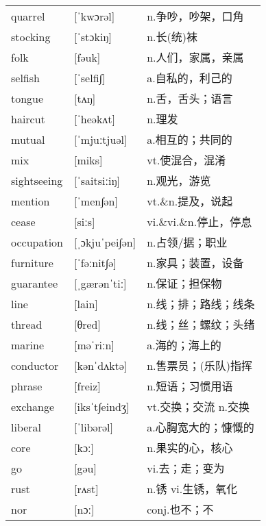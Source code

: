 \documentclass[a4paper]{article}
\begin{document}
\section{}
\begin{tabular}{l l l}

quarrel & [ˈkwɔrəl] & n.争吵，吵架，口角 \\
stocking & [ˈstɔkiŋ] & n.长(统)袜 \\
folk & [fəuk] & n.人们，家属，亲属 \\
selfish & [ˈselfi∫] & a.自私的，利己的 \\
tongue & [tʌŋ] & n.舌，舌头；语言 \\
haircut & [ˈheəkʌt] & n.理发 \\
mutual & [ˈmjuːtjuəl] & a.相互的；共同的 \\
mix & [miks] & vt.使混合，混淆 \\
sightseeing & [ˈsaitsiːiŋ] & n.观光，游览 \\
mention & [ˈmen∫ən] & vt.\&n.提及，说起 \\
cease & [siːs] & vi.\&vi.\&n.停止，停息 \\
occupation & [ˌɔkjuˈpei∫ən] & n.占领/据；职业 \\
furniture & [ˈfəːnit∫ə] & n.家具；装置，设备 \\
guarantee & [ˌgærənˈtiː] & n.保证；担保物 \\
line & [lain] & n.线；排；路线；线条 \\
thread & [θred] & n.线；丝；螺纹；头绪 \\
marine & [məˈriːn] & a.海的；海上的 \\
conductor & [kənˈdʌktə] & n.售票员；(乐队)指挥 \\
phrase & [freiz] & n.短语；习惯用语 \\
exchange & [iksˈt∫eindʒ] & vt.交换；交流 n.交换 \\
liberal & [ˈlibərəl] & a.心胸宽大的；慷慨的 \\
core & [kɔː] & n.果实的心，核心 \\
go & [gəu] & vi.去；走；变为 \\
rust & [rʌst] & n.锈 vi.生锈，氧化 \\
nor & [nɔː] & conj.也不；不 \\

\end{tabular}
\end{document}
